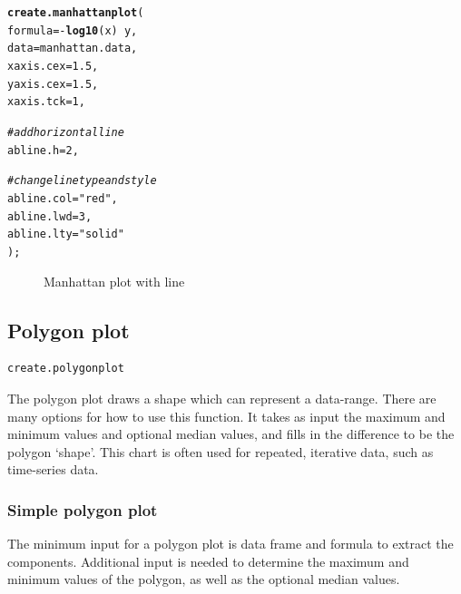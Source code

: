 \documentclass[letterpaper]{report}\usepackage[]{graphicx}\usepackage[]{color}
\makeatletter
\newcommand{\hlnum}[1]{\textcolor[rgb]{0.686,0.059,0.569}{#1}}%
\newcommand{\hlstr}[1]{\textcolor[rgb]{0.192,0.494,0.8}{#1}}%
\newcommand{\hlcom}[1]{\textcolor[rgb]{0.678,0.584,0.686}{\textit{#1}}}%
\newcommand{\hlopt}[1]{\textcolor[rgb]{0,0,0}{#1}}%
\newcommand{\hlstd}[1]{\textcolor[rgb]{0.345,0.345,0.345}{#1}}%
\newcommand{\hlkwc}[1]{\textcolor[rgb]{0.333,0.667,0.333}{#1}}%
\newcommand{\hlkwd}[1]{\textcolor[rgb]{0.737,0.353,0.396}{\textbf{#1}}}%
\newenvironment{kframe}{%
 \def\at@end@of@kframe{}%
 \ifinner\ifhmode%
  \def\at@end@of@kframe{\end{minipage}}%
  \begin{minipage}{\columnwidth}%
 \fi\fi%
 \def\FrameCommand##1{\hskip\@totalleftmargin \hskip-\fboxsep
 \colorbox{shadecolor}{##1}\hskip-\fboxsep
     \hskip-\linewidth \hskip-\@totalleftmargin \hskip\columnwidth}%
 \MakeFramed {\advance\hsize-\width
   \@totalleftmargin\z@ \linewidth\hsize
   \@setminipage}}%
 {\par\unskip\endMakeFramed%
 \at@end@of@kframe}
\newenvironment{knitrout}{}{} %
\makeatother
\begin{document}
\begin{knitrout}
\color{fgcolor}\begin{kframe}
\begin{alltt}
\hlkwd{create.manhattanplot}\hlstd{(}
    \hlkwc{formula} \hlstd{=} \hlopt{-}\hlkwd{log10}\hlstd{(x)} \hlopt{~} \hlstd{y,}
    \hlkwc{data} \hlstd{= manhattan.data,}
    \hlkwc{xaxis.cex} \hlstd{=} \hlnum{1.5}\hlstd{,}
    \hlkwc{yaxis.cex} \hlstd{=} \hlnum{1.5}     \hlstd{,}
    \hlkwc{xaxis.tck} \hlstd{=} \hlnum{1}\hlstd{,}

    \hlcom{# add horizontal line}
    \hlkwc{abline.h} \hlstd{=} \hlnum{2}\hlstd{,}

    \hlcom{# change line type and style}
    \hlkwc{abline.col} \hlstd{=} \hlstr{"red"}\hlstd{,}
    \hlkwc{abline.lwd} \hlstd{=} \hlnum{3}\hlstd{,}
    \hlkwc{abline.lty} \hlstd{=} \hlstr{"solid"}
    \hlstd{);}
\end{alltt}
\end{kframe}\begin{figure}

{\centering {} 

}

\caption[Manhattan plot with line]{Manhattan plot with line\label{fig:manhattan2}}
\end{figure}


\end{knitrout}

\subsection{Polygon plot}
\begin{verbatim}
create.polygonplot
\end{verbatim}

The polygon plot draws a shape which can represent a data-range. There are many options for how to use this function. It takes as input the maximum and minimum values and optional median values, and fills in the difference to be the polygon `shape'. This chart is often used for repeated, iterative data, such as time-series data.

\subsubsection{Simple polygon plot}
The minimum input for a polygon plot is data frame and formula to extract the components. Additional input is needed to determine the maximum and minimum values of the polygon, as well as the optional median values.
\end{document}

